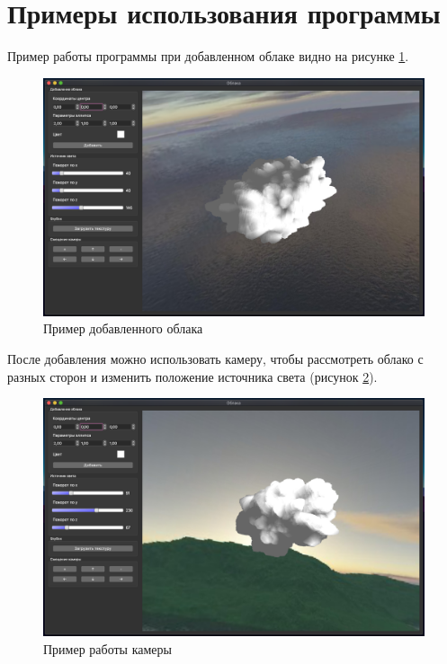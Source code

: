 \section{Примеры использования программы}

Пример работы программы при добавленном облаке видно на рисунке \ref{img:example1}.

\begin{figure}[H]
    \centering
    \includegraphics[scale=0.3]{img/example1.png}
    \caption{Пример добавленного облака}
    \label{img:example1}
\end{figure}

После добавления можно использовать камеру, чтобы рассмотреть облако с разных сторон и изменить положение
источника света (рисунок \ref{img:example2}).

\begin{figure}[H]
    \centering
    \includegraphics[scale=0.3]{img/example2.png}
    \caption{Пример работы камеры}
    \label{img:example2}
\end{figure}

